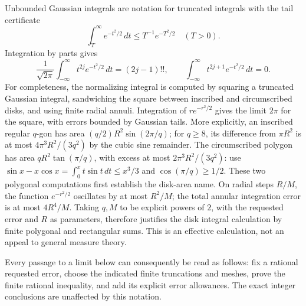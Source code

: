 Unbounded Gaussian integrals are notation for truncated integrals with the
tail certificate
\[
 \int_T^\infty e^{-t^2/2}\,dt\le T^{-1}e^{-T^2/2}\quad(T>0).
\]
Integration by parts gives
\[
 \frac1{\sqrt{2\pi}}\int_{-\infty}^{\infty}t^{2j}e^{-t^2/2}\,dt
 =(2j-1)!!,
 \qquad \int_{-\infty}^{\infty}t^{2j+1}e^{-t^2/2}\,dt=0.
\]
For completeness, the normalizing integral is computed by squaring a truncated
Gaussian integral, sandwiching the square between inscribed and circumscribed
disks, and using finite radial annuli. Integration of
$r e^{-r^2/2}$ gives the limit $2\pi$ for the square, with errors bounded by
Gaussian tails. More explicitly, an inscribed regular $q$-gon has area
$(q/2)R^2\sin(2\pi/q)$; for $q\ge8$, its difference from $\pi R^2$ is at
most $4\pi^3R^2/(3q^2)$ by the cubic sine remainder. The circumscribed
polygon has area $qR^2\tan(\pi/q)$, with excess at most
$2\pi^3R^2/(3q^2)$: use
$\sin x-x\cos x=\int_0^x t\sin t\,dt\le x^3/3$ and
$\cos(\pi/q)\ge1/2$. These two
polygonal computations first establish the disk-area name. On radial steps
$R/M$, the function $e^{-r^2/2}$ oscillates by at most $R^2/M$; the total
annular integration error is at most $4R^4/M$. Taking $q,M$ to be explicit
powers of $2$, with the requested error and $R$ as parameters, therefore
justifies the disk integral calculation by finite polygonal and rectangular
sums. This is an effective calculation, not an appeal to general measure
theory.

Every passage to a limit below can consequently be read as follows: fix a
rational requested error, choose the indicated finite truncations and meshes,
prove the finite rational inequality, and add its explicit error allowances.
The exact integer conclusions are unaffected by this notation.
